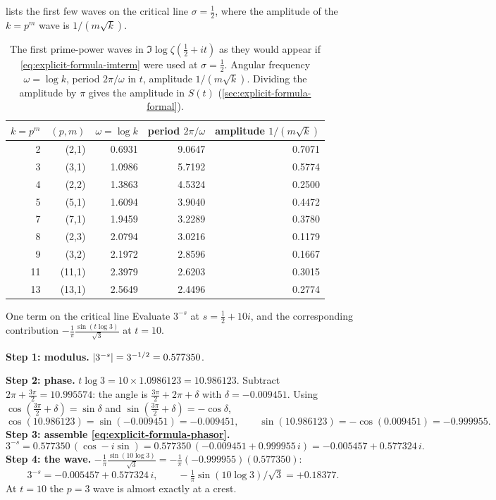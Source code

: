  lists the first few waves on the critical line $\sigma=\tfrac12$, where the amplitude of the $k=p^m$ wave is $1/(m\sqrt{k})$.

\begin{table}[htbp]\centering
\caption{The first prime-power waves in $\Im\log\zeta(\tfrac12+it)$ as they would appear if \cref{eq:explicit-formula-imterm} were used at $\sigma=\tfrac12$. Angular frequency $\omega=\log k$, period $2\pi/\omega$ in $t$, amplitude $1/(m\sqrt k)$. Dividing the amplitude by $\pi$ gives the amplitude in $S(t)$ (\cref{sec:explicit-formula-formal}).}
\label{tab:explicit-formula-amplitudes}
\begin{tabular}{rrrrr}
\toprule
$k=p^m$ & $(p,m)$ & $\omega=\log k$ & period $2\pi/\omega$ & amplitude $1/(m\sqrt k)$\\
\midrule
2 & (2,1) & 0.6931 & 9.0647 & 0.7071\\
3 & (3,1) & 1.0986 & 5.7192 & 0.5774\\
4 & (2,2) & 1.3863 & 4.5324 & 0.2500\\
5 & (5,1) & 1.6094 & 3.9040 & 0.4472\\
7 & (7,1) & 1.9459 & 3.2289 & 0.3780\\
8 & (2,3) & 2.0794 & 3.0216 & 0.1179\\
9 & (3,2) & 2.1972 & 2.8596 & 0.1667\\
11 & (11,1) & 2.3979 & 2.6203 & 0.3015\\
13 & (13,1) & 2.5649 & 2.4496 & 0.2774\\
\bottomrule
\end{tabular}
\end{table}

\begin{sample}{One term on the critical line}
Evaluate $3^{-s}$ at $s=\tfrac12+10i$, and the corresponding contribution $-\frac{1}{\pi}\frac{\sin(t\log3)}{\sqrt3}$ at $t=10$.

\textbf{Step 1: modulus.} $\left\lvert 3^{-s}\right\rvert=3^{-1/2}=0.577350$.

\textbf{Step 2: phase.} $t\log3=10\times1.0986123=10.986123$. Subtract $2\pi+\tfrac{3\pi}{2}=10.995574$: the angle is $\tfrac{3\pi}{2}+2\pi+\delta$ with $\delta=-0.009451$. Using $\cos(\tfrac{3\pi}2+\delta)=\sin\delta$ and $\sin(\tfrac{3\pi}2+\delta)=-\cos\delta$,
\[
\cos(10.986123)=\sin(-0.009451)=-0.009451,\qquad \sin(10.986123)=-\cos(0.009451)=-0.999955.
\]
\textbf{Step 3: assemble \cref{eq:explicit-formula-phasor}.}
\[
3^{-s}=0.577350\,(\cos-i\sin)=0.577350\,(-0.009451+0.999955\,i)=-0.005457+0.577324\,i .
\]
\textbf{Step 4: the wave.} $-\frac1\pi\frac{\sin(10\log3)}{\sqrt3}=-\frac{1}{\pi}(-0.999955)(0.577350)$:
\[
\boxed{3^{-s}=-0.005457+0.577324\,i,\qquad -\tfrac1\pi\sin(10\log 3)/\sqrt3=+0.18377.}
\]
At $t=10$ the $p=3$ wave is almost exactly at a crest.
\end{sample}

